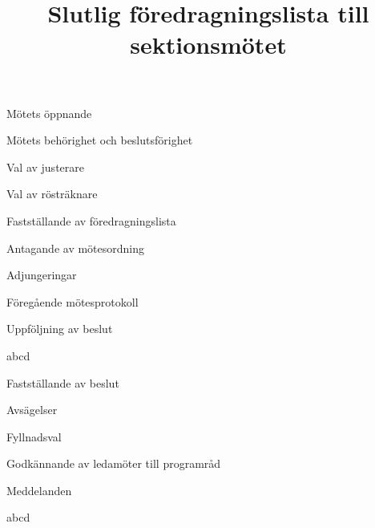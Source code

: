 \documentclass{sektionsmote}
\title{Slutlig föredragningslista till sektionsmötet}
\begin{document}
\maketitle

\begin{ootd}

\item{Mötets öppnande}

\item{Mötets behörighet och beslutsförighet}

\item{Val av justerare}

\item{Val av rösträknare}

\item{Fastställande av föredragningslista}

\item{Antagande av mötesordning}

\item{Adjungeringar}

\item{Föregående mötesprotokoll}

\item{Uppföljning av beslut}
\begin{ootd}
    \item abcd
\end{ootd}

\item{Fastställande av beslut}
\begin{ootd}
    \item Avsägelser
    \item Fyllnadsval
    \item Godkännande av ledamöter till programråd
\end{ootd}

\item{Meddelanden}
\begin{ootd}
    \item abcd
\end{ootd}


\end{ootd}
\end{document}
